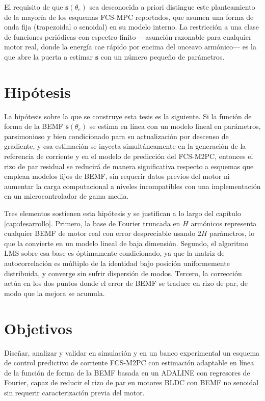 \documentclass[../../../Tesis_JALS_Maestria.tex]{subfiles}
\begin{document}
El requisito de que $\mathbf{s}(\theta_e)$ sea desconocida a priori distingue este planteamiento de la mayoría de los esquemas FCS-MPC reportados, que asumen una forma de onda fija (trapezoidal o senoidal) en su modelo interno. La restricción a una clase de funciones periódicas con espectro finito ---asunción razonable para cualquier motor real, donde la energía cae rápido por encima del onceavo armónico--- es la que abre la puerta a estimar $\mathbf{s}$ con un número pequeño de parámetros.

\section{Hipótesis}
\label{sec:hipotesis}

La hipótesis sobre la que se construye esta tesis es la siguiente. Si la función de forma de la BEMF $\mathbf{s}(\theta_e)$ se estima en línea con un modelo lineal en parámetros, parsimonioso y bien condicionado para su actualización por descenso de gradiente, y esa estimación se inyecta simultáneamente en la generación de la referencia de corriente y en el modelo de predicción del FCS-M2PC, entonces el rizo de par residual se reducirá de manera significativa respecto a esquemas que emplean modelos fijos de BEMF, sin requerir datos previos del motor ni aumentar la carga computacional a niveles incompatibles con una implementación en un microcontrolador de gama media.

Tres elementos sostienen esta hipótesis y se justifican a lo largo del capítulo \ref{cap:desarrollo}. Primero, la base de Fourier truncada en $H$ armónicos representa cualquier BEMF de motor real con error despreciable usando $2H$ parámetros, lo que la convierte en un modelo lineal de baja dimensión. Segundo, el algoritmo LMS sobre esa base es óptimamente condicionado, ya que la matriz de autocorrelación es múltiplo de la identidad bajo posición uniformemente distribuida, y converge sin sufrir dispersión de modos. Tercero, la corrección actúa en los dos puntos donde el error de BEMF se traduce en rizo de par, de modo que la mejora se acumula.

\section{Objetivos}
\label{sec:objetivos}

\begin{objetivo}
\label{obj:general}
Diseñar, analizar y validar en simulación y en un banco experimental un esquema de control predictivo de corriente FCS-M2PC con estimación adaptable en línea de la función de forma de la BEMF basada en un ADALINE con regresores de Fourier, capaz de reducir el rizo de par en motores BLDC con BEMF no senoidal sin requerir caracterización previa del motor.
\end{objetivo}
\end{document}
